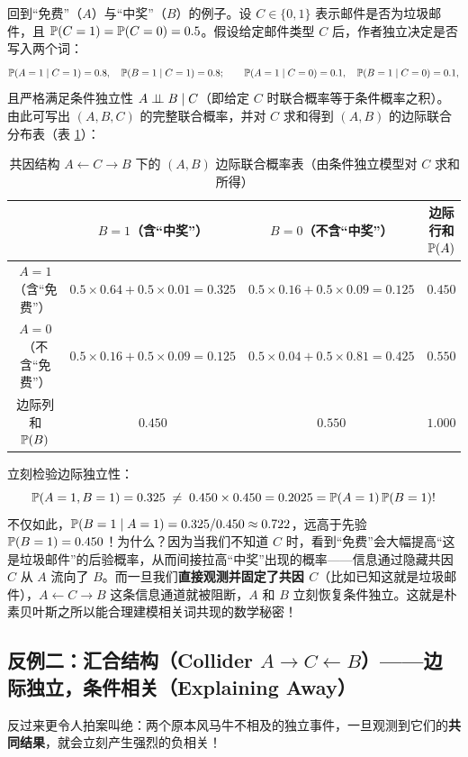 回到“免费”（$A$）与“中奖”（$B$）的例子。设 $C \in \{0, 1\}$ 表示邮件是否为垃圾邮件，且 $\mathbb{P}(C=1) = \mathbb{P}(C=0) = 0.5$。假设给定邮件类型 $C$ 后，作者独立决定是否写入两个词：
\[
  \mathbb{P}(A=1\mid C=1) = 0.8,\quad \mathbb{P}(B=1\mid C=1) = 0.8;\qquad
  \mathbb{P}(A=1\mid C=0) = 0.1,\quad \mathbb{P}(B=1\mid C=0) = 0.1,
\]
且严格满足条件独立性 $A \perp\!\!\!\perp B \mid C$（即给定 $C$ 时联合概率等于条件概率之积）。由此可写出 $(A, B, C)$ 的完整联合概率，并对 $C$ 求和得到 $(A, B)$ 的边际联合分布表（表 \ref{tab:ch1-fork-table}）：

\begin{table}[htbp]
  \centering
  \caption{共因结构 $A \leftarrow C \rightarrow B$ 下的 $(A, B)$ 边际联合概率表（由条件独立模型对 $C$ 求和所得）}
  \label{tab:ch1-fork-table}
  \small
  \begin{tabular}{cccc}
    \toprule
    & $B = 1$（含“中奖”） & $B = 0$（不含“中奖”） & 边际行和 $\mathbb{P}(A)$ \\
    \midrule
    $A = 1$（含“免费”） & $0.5\times 0.64 + 0.5\times 0.01 = \mathbf{0.325}$ & $0.5\times 0.16 + 0.5\times 0.09 = 0.125$ & $0.450$ \\
    $A = 0$（不含“免费”） & $0.5\times 0.16 + 0.5\times 0.09 = 0.125$ & $0.5\times 0.04 + 0.5\times 0.81 = 0.425$ & $0.550$ \\
    \midrule
    边际列和 $\mathbb{P}(B)$ & $0.450$ & $0.550$ & $1.000$ \\
    \bottomrule
  \end{tabular}
\end{table}

立刻检验边际独立性：
\[
  \mathbb{P}(A=1, B=1) = 0.325 \;\neq\; 0.450 \times 0.450 = 0.2025 = \mathbb{P}(A=1)\,\mathbb{P}(B=1)!
\]
不仅如此，$\mathbb{P}(B=1 \mid A=1) = 0.325 / 0.450 \approx 0.722$，远高于先验 $\mathbb{P}(B=1) = 0.450$！为什么？因为当我们不知道 $C$ 时，看到“免费”会大幅提高“这是垃圾邮件”的后验概率，从而间接拉高“中奖”出现的概率——信息通过隐藏共因 $C$ 从 $A$ 流向了 $B$。而一旦我们\textbf{直接观测并固定了共因 $C$}（比如已知这就是垃圾邮件），$A \leftarrow C \rightarrow B$ 这条信息通道就被阻断，$A$ 和 $B$ 立刻恢复条件独立。这就是朴素贝叶斯之所以能合理建模相关词共现的数学秘密！

\subsection{反例二：汇合结构（Collider $A \rightarrow C \leftarrow B$）——边际独立，条件相关（Explaining Away）}

反过来更令人拍案叫绝：两个原本风马牛不相及的独立事件，一旦观测到它们的\textbf{共同结果}，就会立刻产生强烈的负相关！

